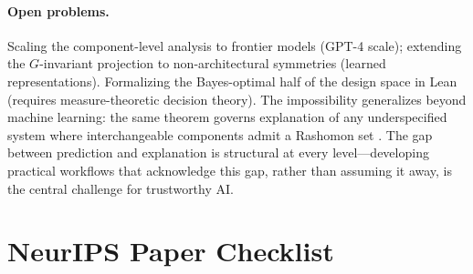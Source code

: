 \documentclass{article}
\begin{document}
\paragraph{Open problems.}
Scaling the component-level analysis to frontier models (GPT-4 scale); extending the $G$-invariant projection to non-architectural symmetries (learned representations). Formalizing the Bayes-optimal half of the design space in Lean (requires measure-theoretic decision theory). The impossibility generalizes beyond machine learning: the same theorem governs explanation of any underspecified system where interchangeable components admit a Rashomon set \citep{caraker2026limits}. The gap between prediction and explanation is structural at every level---developing practical workflows that acknowledge this gap, rather than assuming it away, is the central challenge for trustworthy AI.




\newpage
\section*{NeurIPS Paper Checklist}
\end{document}
